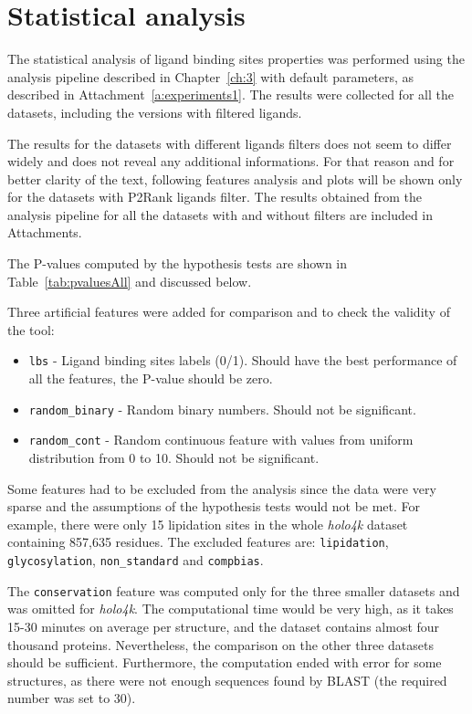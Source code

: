 \newpage
\section{Statistical analysis}

The statistical analysis of ligand binding sites properties was performed using the analysis pipeline described in Chapter~\ref{ch:3} with default parameters, as described in Attachment~\ref{a:experiments1}. The results were collected for all the datasets, including the versions with filtered ligands.

The results for the datasets with different ligands filters does not seem to differ widely and does not reveal any additional informations. For that reason and for better clarity of the text, following features analysis and plots will be shown only for the datasets with P2Rank ligands filter. The results obtained from the analysis pipeline for all the datasets with and without filters are included in Attachments.

The P-values computed by the hypothesis tests are shown in Table~\ref{tab:pvaluesAll} and discussed below.

Three artificial features were added for comparison and to check the validity of the tool:
\begin{itemize}
  \item \texttt{lbs} - Ligand binding sites labels (0/1). Should have the best performance of all the features, the P-value should be zero.
  \item \texttt{random\_binary} - Random binary numbers. Should not be significant.
  \item \texttt{random\_cont} - Random continuous feature with values from uniform distribution from 0 to 10. Should not be significant.
\end{itemize}

Some features had to be excluded from the analysis since the data were very sparse and the assumptions of the hypothesis tests would not be met. For example, there were only 15 lipidation sites in the whole \textit{holo4k} dataset containing  857,635 residues. The excluded features are: \texttt{lipidation}, \texttt{glycosylation}, \texttt{non\_standard} and \texttt{compbias}.

The \texttt{conservation} feature was computed only for the three smaller datasets and was omitted for \textit{holo4k}. The computational time would be very high, as it takes 15-30 minutes on average per structure, and the dataset contains almost four thousand proteins. Nevertheless, the comparison on the other three datasets should be sufficient. Furthermore, the computation ended with error for some structures, as there were not enough sequences found by BLAST \cite{blast} (the required number was set to 30).


